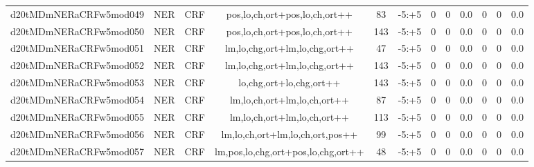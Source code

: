 \documentclass[a4paper]{article}
\begin{document}
\begin{landscape}
\begin{center}
\begin{tabular}{ |c|c|c|c|c|c|c|c|c|c|c|c|}
 	\small{ d20tMDmNERaCRFw5mod049 } & \small{ NER} & \small{  CRF }  & pos,lo,ch,ort+pos,lo,ch,ort++  &  83 &  \small{  -5:+5 }  &  0 & 0 & 0.0  &  0 & 0 & 0.0 \\
 	

 
 	
 	\small{ d20tMDmNERaCRFw5mod050 } & \small{ NER} & \small{  CRF }  & pos,lo,ch,ort+pos,lo,ch,ort++  &  143 &  \small{  -5:+5 }  &  0 & 0 & 0.0  &  0 & 0 & 0.0 \\
 	

 
 	
 	\small{ d20tMDmNERaCRFw5mod051 } & \small{ NER} & \small{  CRF }  & lm,lo,chg,ort+lm,lo,chg,ort++  &  47 &  \small{  -5:+5 }  &  0 & 0 & 0.0  &  0 & 0 & 0.0 \\
 	

 
 	
 	\small{ d20tMDmNERaCRFw5mod052 } & \small{ NER} & \small{  CRF }  & lm,lo,chg,ort+lm,lo,chg,ort++  &  143 &  \small{  -5:+5 }  &  0 & 0 & 0.0  &  0 & 0 & 0.0 \\
 	

 
 	
 	\small{ d20tMDmNERaCRFw5mod053 } & \small{ NER} & \small{  CRF }  & lo,chg,ort+lo,chg,ort++  &  143 &  \small{  -5:+5 }  &  0 & 0 & 0.0  &  0 & 0 & 0.0 \\
 	

 
 	
 	\small{ d20tMDmNERaCRFw5mod054 } & \small{ NER} & \small{  CRF }  & lm,lo,ch,ort+lm,lo,ch,ort++  &  87 &  \small{  -5:+5 }  &  0 & 0 & 0.0  &  0 & 0 & 0.0 \\
 	

 
 	
 	\small{ d20tMDmNERaCRFw5mod055 } & \small{ NER} & \small{  CRF }  & lm,lo,ch,ort+lm,lo,ch,ort++  &  113 &  \small{  -5:+5 }  &  0 & 0 & 0.0  &  0 & 0 & 0.0 \\
 	

 
 	
 	\small{ d20tMDmNERaCRFw5mod056 } & \small{ NER} & \small{  CRF }  & lm,lo,ch,ort+lm,lo,ch,ort,pos++  &  99 &  \small{  -5:+5 }  &  0 & 0 & 0.0  &  0 & 0 & 0.0 \\
 	

 
 	
 	\small{ d20tMDmNERaCRFw5mod057 } & \small{ NER} & \small{  CRF }  & lm,pos,lo,chg,ort+pos,lo,chg,ort++  &  48 &  \small{  -5:+5 }  &  0 & 0 & 0.0  &  0 & 0 & 0.0 \\
 	


\end{tabular}
\end{center}
\end{landscape}
\end{document}
